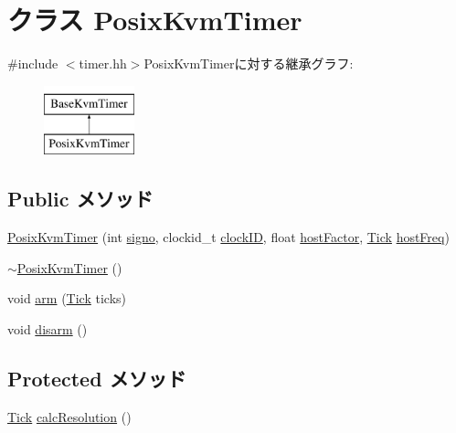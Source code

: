 \hypertarget{classPosixKvmTimer}{
\section{クラス PosixKvmTimer}
\label{classPosixKvmTimer}
}


{\ttfamily \#include $<$timer.hh$>$}PosixKvmTimerに対する継承グラフ:\begin{figure}[H]
\begin{center}
\leavevmode
\includegraphics[height=2cm]{classPosixKvmTimer}
\end{center}
\end{figure}
\subsection*{Public メソッド}
\begin{DoxyCompactItemize}
\item 
\hyperlink{classPosixKvmTimer_a8de164097b5374e298ea92b3e23c1951}{PosixKvmTimer} (int \hyperlink{classBaseKvmTimer_a68acd751895efa9ac5a6461017f1d2d8}{signo}, clockid\_\-t \hyperlink{classPosixKvmTimer_a3ad1d5e961d76190ddbf7559f642a11e}{clockID}, float \hyperlink{classBaseKvmTimer_a0ef366aa4bbbcdc2f7eeb7fcd3962dde}{hostFactor}, \hyperlink{base_2types_8hh_a5c8ed81b7d238c9083e1037ba6d61643}{Tick} \hyperlink{classBaseKvmTimer_af880b55be2bf83ac65eb9b0abe62ae49}{hostFreq})
\item 
\hyperlink{classPosixKvmTimer_a83d2c8118d7b82a9bbd040e05626d705}{$\sim$PosixKvmTimer} ()
\item 
void \hyperlink{classPosixKvmTimer_a5041ff590d50fcb1f0f5149b2e7eb4bb}{arm} (\hyperlink{base_2types_8hh_a5c8ed81b7d238c9083e1037ba6d61643}{Tick} ticks)
\item 
void \hyperlink{classPosixKvmTimer_a9882bfa120cede575461197f2a13cd8b}{disarm} ()
\end{DoxyCompactItemize}
\subsection*{Protected メソッド}
\begin{DoxyCompactItemize}
\item 
\hyperlink{base_2types_8hh_a5c8ed81b7d238c9083e1037ba6d61643}{Tick} \hyperlink{classPosixKvmTimer_a02798cc202bebceef3ff0e3ff3d7b5b8}{calcResolution} ()
\end{DoxyCompactItemize}
